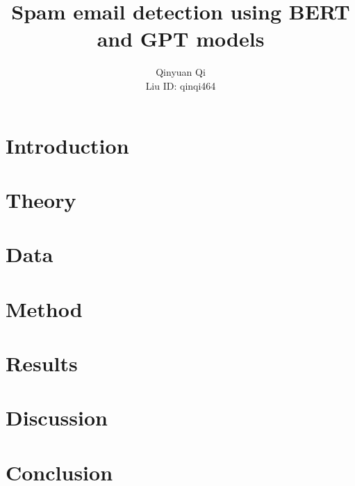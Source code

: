 \documentclass[11pt]{article}
\title{Spam email detection using BERT and GPT models}
\author{Qinyuan Qi \\
  Liu ID: qinqi464 \\
}
\begin{document}
\maketitle
\begin{abstract}

\end{abstract}

\section{Introduction}


\section{Theory}


\section{Data}


\section{Method}


\section{Results}


\section{Discussion}


\section{Conclusion}
 



\appendix
\end{document}
